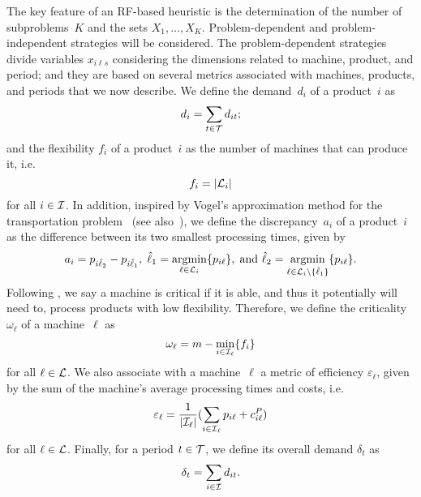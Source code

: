 \documentclass[11pt]{article}
\DeclareMathOperator*{\argmin}{\mathrm{argmin}}
\begin{document}
The key feature of an RF-based heuristic is the determination of the number of subproblems~$K$ and the sets $X_1, \dots, X_K$. Problem-dependent and problem-independent strategies will be considered. The problem-dependent strategies divide variables $x_{i \ell s}$ considering the dimensions related to machine, product, and period; and they are based on several metrics associated with machines, products, and periods that we now describe. We define the demand~$d_i$ of a product~$i$ as
\begin{equation} \label{prodem}
d_i = \sum_{t \in {\cal T}} d_{it};
\end{equation}
and the flexibility $f_i$ of a product~$i$ as the number of machines that can produce it, i.e.\ 
\begin{equation} \label{proversa}
f_i = | {\cal L}_i |
\end{equation}
for all $i \in {\cal I}$. In addition, inspired by Vogel's approximation method for the transportation problem~\citep[\S4]{vogel} (see also~\cite{glover}), we define the discrepancy~$a_i$ of a product~$i$ as the difference between its two smallest processing times, given by
\begin{equation} \label{discrepancy}
a_i = p_{i \hat \ell_2} - p_{i \hat \ell_1}, \;
\hat \ell_1 = \argmin_{\ell \in {\cal L}_{i}} \{ p_{i\ell} \}, \;
\mbox{and }
\hat \ell_2 = \argmin_{\ell \in {\cal L}_{i} \setminus \{\hat \ell_1\}} \{ p_{i\ell} \}.
\end{equation}
Following \cite{dastidar2005scheduling}, we say a machine is critical if it is able, and thus it potentially will need to, process products with low flexibility. Therefore, we define the criticality~$\omega_\ell$ of a machine~$\ell$ as 
\begin{equation} \label{maqcrit}
\omega_\ell = m - \min_{i \in {\cal I}_\ell} \{ f_i \}
\end{equation}
for all $\ell \in {\cal L}$. We also associate with a machine~$\ell$ a metric of efficiency $\varepsilon_\ell$, given by the sum of the machine's average processing times and costs, i.e.\ 
\begin{equation} \label{maqeff}
\varepsilon_\ell = \frac{1}{| {\cal I}_\ell |} ( \sum_{{i \in \cal I}_\ell} p_{i\ell} + c_{i\ell}^P )
\end{equation}
for all $\ell \in {\cal L}$. Finally, for a period $t \in {\cal T}$, we define its overall demand $\delta_t$ as 
\begin{equation} \label{perdem}
\delta_t = \sum_{i \in {\cal I}} d_{it}.
\end{equation}
\end{document}
